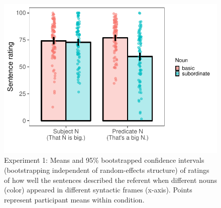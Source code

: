 \documentclass[10pt,letterpaper]{article}
\begin{document}
\begin{figure}[t]
\begin{center}
\includegraphics[width=\linewidth]{expt-syntax-rating-prereg-bars-revised.pdf}
\end{center}
\vspace{-1cm}
\caption{Experiment 1: Means and 95\% bootstrapped confidence intervals (bootstrapping independent of random-effects structure) of ratings of how well the sentences described the referent when different nouns (color) appeared in different syntactic frames (x-axis).  Points represent participant means within condition.
}
\label{syntax-rating}
\end{figure}
\end{document}
